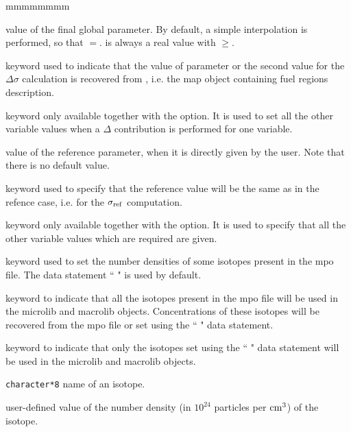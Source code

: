 \begin{ListeDeDescription}{mmmmmmmm}
\item[\dusa{val2}] value of the final global parameter. By default, a simple interpolation is performed, so that $=$.  is always a real value with $\ge$.

\item[\moc{MAP}] keyword used to indicate that the value of parameter  or the second value for the $\Delta\sigma$ calculation is
recovered from , i.e. the {\sc map} object containing fuel regions description.

\item[\moc{REF}] keyword only available together with the  option. It is used to set all the other variable values when a $\Delta$ contribution is performed for one variable.  

\item[\dusa{valref}] value of the reference parameter, when it is directly given by the user. Note that there is no default value.

\item[\moc{SAMEASREF}] keyword used to specify that the reference value will be the same as in the refence case, i.e. for the $\sigma_{\rm ref}$ computation.

\item[\moc{ENDREF}] keyword only available together with the  option. It is used to specify that all the other variable values which are required are given.  

\item[\moc{MICRO}] keyword used to set the number densities of some isotopes present in the {\sc mpo} file. The data statement `` " is used by default.

\item[\moc{ALL}] keyword to indicate that all the isotopes present in the {\sc mpo} file will be used in the {\sc microlib} and {\sc macrolib} objects. Concentrations of these isotopes will be recovered from the {\sc mpo} file or set using
the `` " data statement.

\item[\moc{ONLY}] keyword to indicate that only the isotopes set using the `` " data statement will be used in the {\sc microlib} and {\sc macrolib} objects.

\item[\dusa{HISO}] {\tt character*8} name of an isotope.

\item[\dusa{conc}] user-defined value of the number density (in $10^{24}$ particles per ${\rm cm}^3$) of the isotope.


\end{ListeDeDescription}
